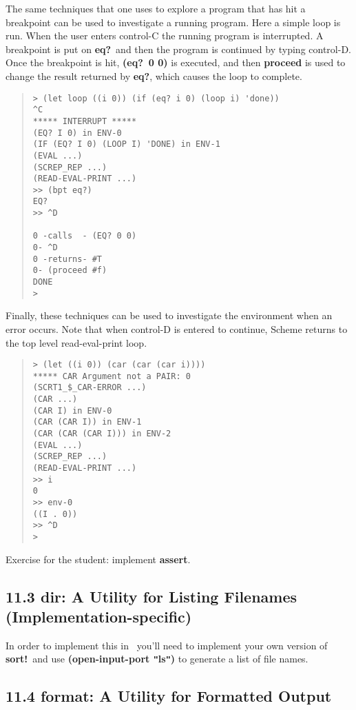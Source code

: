 \documentclass[10pt]{article}
\begin{document}
The same techniques that one uses to explore a program that
has hit a breakpoint can be used to investigate a running
program.  Here a simple loop is run.  When the user enters
control-C the running program is interrupted.  A breakpoint is
put on \textbf{eq?}\ and then the program is continued by typing
control-D.  Once the breakpoint is hit, \textbf{(eq?\ 0 0)} is
executed, and then \textbf{proceed} is used to change the result
returned by \textbf{eq?}, which causes the loop to complete.

\begin{quote}
\begin{verbatim}
> (let loop ((i 0)) (if (eq? i 0) (loop i) 'done))
^C
***** INTERRUPT *****
(EQ? I 0) in ENV-0
(IF (EQ? I 0) (LOOP I) 'DONE) in ENV-1
(EVAL ...)
(SCREP_REP ...)
(READ-EVAL-PRINT ...)
>> (bpt eq?)
EQ?
>> ^D

0 -calls  - (EQ? 0 0)
0- ^D
0 -returns- #T
0- (proceed #f)
DONE
>
\end{verbatim}
\end{quote}

Finally, these techniques can be used to investigate the
environment when an error occurs.  Note that when control-D is
entered to continue, Scheme returns to the top level
read-eval-print loop.

\begin{quote}
\begin{verbatim}
> (let ((i 0)) (car (car (car i))))
***** CAR Argument not a PAIR: 0
(SCRT1_$_CAR-ERROR ...)
(CAR ...)
(CAR I) in ENV-0
(CAR (CAR I)) in ENV-1
(CAR (CAR (CAR I))) in ENV-2
(EVAL ...)
(SCREP_REP ...)
(READ-EVAL-PRINT ...)
>> i
0
>> env-0
((I . 0))
>> ^D
>
\end{verbatim}
\end{quote}

Exercise for the student:  implement \textbf{assert}.

\subsection*{11.3 dir: A Utility for Listing Filenames (Implementation-specific)}

In order to implement this in \StoC\ you'll need to implement your
own version of \textbf{sort!}\ and use \textbf{(open-input-port \texttt{"}ls\texttt{"})} to generate a
list of file names.

\subsection*{11.4 format: A Utility for Formatted Output}
\end{document}
